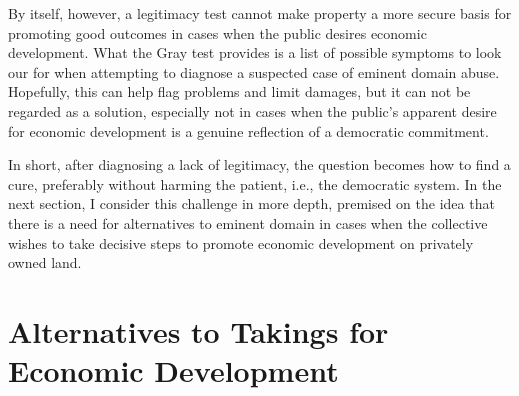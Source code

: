 By itself, however, a legitimacy test cannot make property a more secure basis for promoting good outcomes in cases when the public desires economic development. What the Gray test provides is a list of possible symptoms to look our for when attempting to diagnose a suspected case of eminent domain abuse. Hopefully, this can help flag problems and limit damages, but it can not be regarded as a solution, especially not in cases when the public's apparent desire for economic development is a genuine reflection of a democratic commitment. 

In short, after diagnosing a lack of legitimacy, the question becomes how to find a cure, preferably without harming the patient, i.e., the democratic system. In the next section, I consider this challenge in more depth, premised on the idea that there is a need for alternatives to eminent domain in cases when the collective wishes to take decisive steps to promote economic development on privately owned land.

\section{Alternatives to Takings for Economic Development}\label{sec:3:6}

